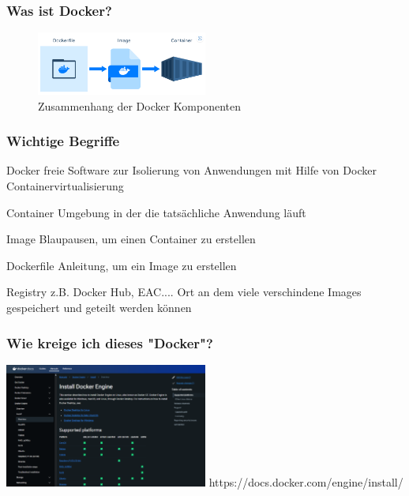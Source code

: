 \documentclass[22pt,handout]{beamer}
\begin{document}
\begin{frame}[t]
    \frametitle{Was ist Docker?}
    \begin{figure}[h]
        \centering
        \includegraphics[width=0.5\textwidth]{Bilder/Docker-Ablauf.png}
        \caption{Zusammenhang der Docker Komponenten}
    \end{figure}
\end{frame}

\begin{frame}[t]
    \frametitle{Wichtige Begriffe}
    \begin{block}{Docker}
        freie Software zur Isolierung von Anwendungen mit Hilfe von     Docker
        Containervirtualisierung
    \end{block}
    \begin{block}{Container}
        Umgebung in der die tatsächliche Anwendung läuft
    \end{block}
    \begin{block}{Image}
        Blaupausen, um einen Container zu erstellen
    \end{block}
    \begin{block}{Dockerfile}
        Anleitung, um ein Image zu erstellen
    \end{block}
    \begin{block}{Registry}
        z.B. Docker Hub, EAC....
        Ort an dem viele verschindene Images gespeichert und geteilt werden können
    \end{block}
\end{frame}

\begin{frame}[t]
    \frametitle{Wie kreige ich dieses "Docker"?}
    \includegraphics[width=0.5\textwidth]{Bilder/Installation.png}
    https://docs.docker.com/engine/install/ 
\end{frame}
\end{document}
